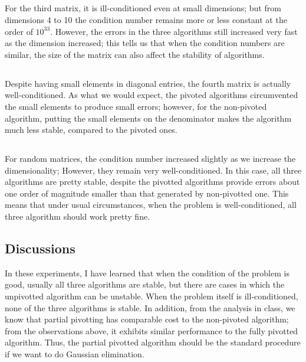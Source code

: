 \documentclass[11pt]{article}
\begin{document}
\subsection{}
For the third matrix, it is ill-conditioned even at small dimensions; but from dimensions 4 to 10 the condition number remains more or less constant at the order of $10^{33}$. However, the errors in the three algorithms still increased very fast as the dimension increased; this tells us that when the condition numbers are similar, the size of the matrix can also affect the stability of algorithms.
\pagebreak
\subsection{}
Despite having small elements in diagonal entries, the fourth matrix is actually well-conditioned. As what we would expect, the pivoted algorithms circumvented the small elements to produce small errors; however, for the non-pivoted algorithm, putting the small elements on the denominator makes the algorithm much less stable, compared to the pivoted ones.
\pagebreak
\subsection{}
For random matrices, the condition number increased slightly as we increase the dimensionality; However, they remain very well-conditioned. In this case, all three algorithms are pretty stable, despite the pivotted algorithms provide errors about one order of magnitude smaller than that generated by non-pivotted one. This means that under usual circumstances, when the problem is well-conditioned, all three algorithm should work pretty fine.
\pagebreak
\subsection{Discussions}
In these experiments, I have learned that when the condition of the problem is good, usually all three algorithms are stable, but there are cases in which the unpivotted algorithm can be unstable. When the problem itself is ill-conditioned, none of the three algorithms is stable. In addition, from the analysis in class, we know that partial pivotting has comparable cost to the non-pivoted algorithm; from the observations above, it exhibits similar performance to the fully pivotted algorithm. Thus, the partial pivotted algorithm should be the standard procedure if we want to do Gaussian elimination.
\end{document}
